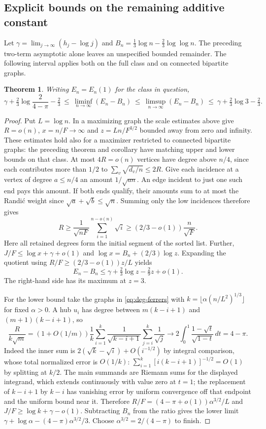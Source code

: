 \documentclass[11pt,a4paper]{article}
\newtheorem{theorem}{Theorem}[section]
\theoremstyle{remark}\newtheorem*{remark}{Remark}
\begin{document}
\subsection{Explicit bounds on the remaining additive constant}
Let $\gamma=\lim_{j\to\infty}(h_j-\log j)$ and
$B_n=\tfrac13\log n-\tfrac23\log\log n$. The preceding two-term
asymptotic alone leaves an unspecified bounded remainder. The following
interval applies both on the full class and on connected bipartite graphs.
\begin{theorem}\label{thm:degree-constant}
Writing $E_n=E_n(1)$ for the class in question,
\[
 \gamma+\tfrac23\log\frac{2}{4-\pi}-\tfrac23
 \ \le\ \liminf_{n\to\infty}(E_n-B_n)
 \ \le\ \limsup_{n\to\infty}(E_n-B_n)
 \ \le\ \gamma+\tfrac23\log3-\tfrac23.
\]
\end{theorem}
\begin{proof}
Put $L=\log n$. In a maximizing graph the scale estimates above
give $R=o(n)$, $x=n/F\to\infty$ and
$z=Ln/F^{3/2}$ bounded away from zero and infinity. These estimates
hold also for a maximizer restricted to connected bipartite graphs:
the preceding theorem and corollary have matching upper and lower
bounds on that class.
At most $4R=o(n)$ vertices have degree above $n/4$, since each contributes
more than $1/2$ to $\sum_v\sqrt{d_v/n}\le2R$.
Give each incidence at a vertex of degree $a\le n/4$ an amount
$1/\sqrt{an}$. An edge incident to just one such end pays this amount.
If both ends qualify, their amounts sum to at most the Randi\'c weight
since $\sqrt a+\sqrt b\le\sqrt n$. Summing only the low incidences
therefore gives
\[
 R\ge\frac1{\sqrt{nF}}\sum_{i=1}^{n-o(n)}\sqrt i
     \ge(2/3-o(1))\frac n{\sqrt F}.
\]
Here all retained degrees form the initial segment of the sorted list.
Further, $J/F\le\log x+\gamma+o(1)$ and
$\log x=B_n+(2/3)\log z$. Expanding the quotient using
$R/F\ge(2/3-o(1))z/L$ yields
\[
 E_n-B_n\le\gamma+\tfrac23\log z-\tfrac29z+o(1).
\]
The right-hand side has its maximum at $z=3$.

For the lower bound take the graphs in \eqref{eq:deg-ferrers} with
$k=\lfloor \alpha(n/L^2)^{1/3}\rfloor$ for fixed $\alpha>0$.
A hub $u_i$ has degree between $m(k-i+1)$ and $(m+1)(k-i+1)$, so
\[
 \frac{R}{k\sqrt m}
 =(1+O(1/m))\frac1k\sum_{i=1}^k
    \frac1{\sqrt{k-i+1}}\sum_{j=i}^k\frac1{\sqrt j}
 \longrightarrow 2\int_0^1\frac{1-\sqrt t}{\sqrt{1-t}}\,dt=4-\pi .
\]
Indeed the inner sum is $2(\sqrt k-\sqrt i)+O(i^{-1/2})$ by
integral comparison, whose total normalized error is $O(1/k)$:
$\sum_{i=1}^k[i(k-i+1)]^{-1/2}=O(1)$ by splitting at $k/2$.
The main summands are Riemann sums for the displayed integrand, which
extends continuously with value zero at $t=1$; the replacement of
$k-i+1$ by $k-i$ has vanishing error by uniform convergence off
that endpoint and the uniform bound near it.
Therefore $R/F=(4-\pi+o(1))\alpha^{3/2}/L$ and
$J/F\ge\log k+\gamma-o(1)$.
Subtracting $B_n$ from the ratio gives the lower limit
$\gamma+\log\alpha-(4-\pi)\alpha^{3/2}/3$.
Choose $\alpha^{3/2}=2/(4-\pi)$ to finish.
\end{proof}
\end{document}
